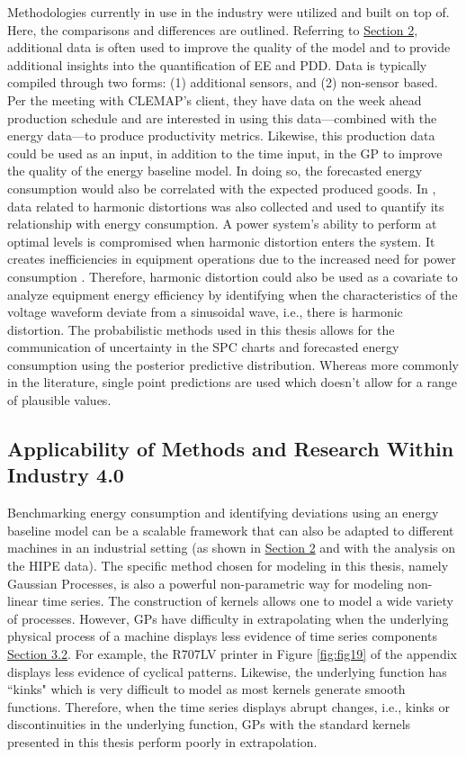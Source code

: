 Methodologies currently in use in the industry were utilized and built on top of. Here, the comparisons and differences are outlined. Referring to \hyperlink{section.2}{Section 2}, additional data is often used to improve the quality of the model and to provide additional insights into the quantification of EE and PDD. Data is typically compiled through two forms: (1) additional sensors, and (2) non-sensor based. Per the meeting with CLEMAP's client, they have data on the week ahead production schedule and are interested in using this data—combined with the energy data—to produce productivity metrics. Likewise, this production data could be used as an input, in addition to the time input, in the GP to improve the quality of the energy baseline model. In doing so, the forecasted energy consumption would also be correlated with the expected produced goods. In \cite{HIPE} \cite{boiler} \cite{gas-turbine-faults}, data related to harmonic distortions was also collected and used to quantify its relationship with energy consumption. A power system’s ability to perform at optimal levels is compromised when harmonic distortion enters the system. It creates inefficiencies in equipment operations due to the increased need for power consumption \cite{noauthor_harmonic_2021}. Therefore, harmonic distortion could also be used as a covariate to analyze equipment energy efficiency by identifying when the characteristics of the voltage waveform deviate from a sinusoidal wave, i.e., there is harmonic distortion. The probabilistic methods used in this thesis allows for the communication of uncertainty in the SPC charts and forecasted energy consumption using the posterior predictive distribution. Whereas more commonly in the literature, single point predictions are used which doesn't allow for a range of plausible values. 

\subsection{Applicability of Methods and Research Within Industry 4.0}

Benchmarking energy consumption and identifying deviations using an energy baseline model can be a scalable framework that can also be adapted to different machines in an industrial setting (as shown in \hyperlink{section.2}{Section 2} and with the analysis on the HIPE data). The specific method chosen for modeling in this thesis, namely Gaussian Processes, is also a powerful non-parametric way for modeling non-linear time series. The construction of kernels allows one to model a wide variety of processes. However, GPs have difficulty in extrapolating when the underlying physical process of a machine displays less evidence of time series components \hyperlink{subsection.3.2}{Section 3.2}. For example, the R707LV printer in Figure \ref{fig:fig19} of the appendix displays less evidence of cyclical patterns. Likewise, the underlying function has ``kinks" which is very difficult to model as most kernels generate smooth functions. Therefore, when the time series displays abrupt changes, i.e., kinks or discontinuities in the underlying function, GPs with the standard kernels presented in this thesis perform poorly in extrapolation. 


